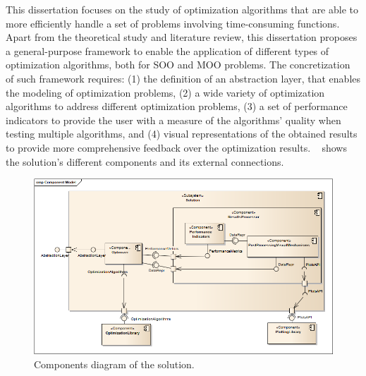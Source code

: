 \label{chap:architecture}

This dissertation focuses on the study of optimization algorithms that are able to more efficiently handle a set of problems involving time-consuming functions. Apart from the theoretical study and literature review, this dissertation proposes a general-purpose framework to enable the application of different types of optimization algorithms, both for \ac{SOO} and \ac{MOO} problems. The concretization of such framework requires: (1) the definition of an abstraction layer, that enables the modeling of optimization problems, (2) a wide variety of optimization algorithms to address different optimization problems, (3) a set of performance indicators to provide the user with a measure of the algorithms' quality when testing multiple algorithms, and (4) visual representations of the obtained results to provide more comprehensive feedback over the optimization results. ~ shows the  solution's different components and its external connections.

\begin{figure}[htbp]
	\centering
	\includegraphics[width=\textwidth]{./Images/Solution/ComponentModel3.png}
	\caption{Components diagram of the solution.}
	\label{fig:solution}
\end{figure}

